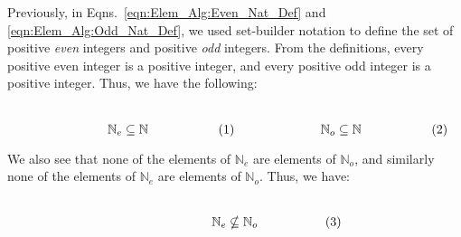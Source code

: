 \documentclass[crop=false,class=book,oneside]{standalone}                      %
\begin{document}
            \begin{lexample}
                Previously, in Eqns.~\ref{eqn:Elem_Alg:Even_Nat_Def}
                and \ref{eqn:Elem_Alg:Odd_Nat_Def}, we used
                set-builder notation to define the set of positive
                \textit{even} integers and positive \textit{odd}
                integers. From the definitions, every positive
                even integer is a positive integer, and every
                positive odd integer is a positive integer.
                Thus, we have the following:
                \par
                \begin{subequations}
                    \begin{minipage}{0.49\textwidth}
                        \centering
                        \begin{equation}
                            \mathbb{N}_{e}\subseteq\mathbb{N}
                        \end{equation}
                    \end{minipage}
                    \hfill
                    \begin{minipage}{0.49\textwidth}
                        \centering
                        \begin{equation}
                            \mathbb{N}_{o}\subseteq\mathbb{N}
                        \end{equation}
                    \end{minipage}
                \end{subequations}
                \par\vspace{2.5ex}
                We also see that none of the elements of
                $\mathbb{N}_{e}$ are elements of $\mathbb{N}_{o}$,
                and similarly none of the elements of
                $\mathbb{N}_{e}$ are elements of $\mathbb{N}_{o}$.
                Thus, we have:
                \par
                \begin{subequations}
                    \begin{minipage}{0.49\textwidth}
                        \centering
                        \begin{equation}
                            \mathbb{N}_{e}\nsubseteq\mathbb{N}_{o}
                        \end{equation}
                    \end{minipage}

\end{subequations}
\end{lexample}
\end{document}
